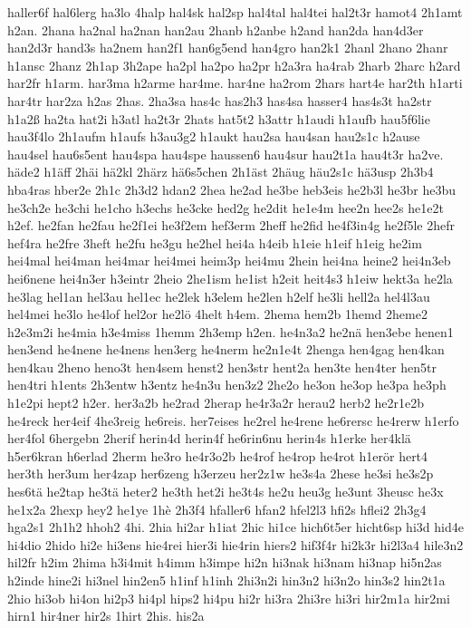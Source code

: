 {haller6f
hal6lerg
ha3lo
4halp
hal4sk
hal2sp
hal4tal
hal4tei
hal2t3r
hamot4
2h1amt
h2an.
2hana
ha2nal
ha2nan
han2au
2hanb
h2anbe
h2and
han2da
han4d3er
han2d3r
hand3s
ha2nem
han2f1
han6g5end
han4gro
han2k1
2hanl
2hano
2hanr
h1ansc
2hanz
2h1ap
3h2ape
ha2pl
ha2po
ha2pr
h2a3ra
ha4rab
2harb
2harc
h2ard
har2fr
h1arm.
har3ma
h2arme
har4me.
har4ne
ha2rom
2hars
hart4e
har2th
h1arti
har4tr
har2za
h2as
2has.
2ha3sa
has4c
has2h3
has4sa
hasser4
has4s3t
ha2str
h1a2ß
ha2ta
hat2i
h3atl
ha2t3r
2hats
hat5t2
h3attr
h1audi
h1aufb
hau5f6lie
hau3f4lo
2h1aufm
h1aufs
h3au3g2
h1aukt
hau2sa
hau4san
hau2s1c
h2ause
hau4sel
hau6s5ent
hau4spa
hau4spe
haussen6
hau4sur
hau2t1a
hau4t3r
ha2ve.
häde2
h1äff
2häi
hä2kl
2härz
hä6s5chen
2h1äst
2häug
häu2s1c
hä3usp
2h3b4
hba4ras
hber2e
2h1c
2h3d2
hdan2
2hea
he2ad
he3be
heb3eis
he2b3l
he3br
he3bu
he3ch2e
he3chi
he1cho
h3echs
he3cke
hed2g
he2dit
he1e4m
hee2n
hee2s
he1e2t
h2ef.
he2fan
he2fau
he2f1ei
he3f2em
hef3erm
2heff
he2fid
he4f3in4g
he2f5le
2hefr
hef4ra
he2fre
3heft
he2fu
he3gu
he2hel
hei4a
h4eib
h1eie
h1eif
h1eig
he2im
hei4mal
hei4man
hei4mar
hei4mei
heim3p
hei4mu
2hein
hei4na
heine2
hei4n3eb
hei6nene
hei4n3er
h3eintr
2heio
2he1ism
he1ist
h2eit
heit4s3
h1eiw
hekt3a
he2la
he3lag
hel1an
hel3au
hel1ec
he2lek
h3elem
he2len
h2elf
he3li
hell2a
hel4l3au
hel4mei
he3lo
he4lof
hel2or
he2lö
4helt
h4em.
2hema
hem2b
1hemd
2heme2
h2e3m2i
he4mia
h3e4miss
1hemm
2h3emp
h2en.
he4n3a2
he2nä
hen3ebe
henen1
hen3end
he4nene
he4nens
hen3erg
he4nerm
he2n1e4t
2henga
hen4gag
hen4kan
hen4kau
2heno
heno3t
hen4sem
henst2
hen3str
hent2a
hen3te
hen4ter
hen5tr
hen4tri
h1ents
2h3entw
h3entz
he4n3u
hen3z2
2he2o
he3on
he3op
he3pa
he3ph
h1e2pi
hept2
h2er.
her3a2b
he2rad
2herap
he4r3a2r
herau2
herb2
he2r1e2b
he4reck
her4eif
4he3reig
he6reis.
her7eises
he2rel
he4rene
he6rersc
he4rerw
h1erfo
her4fol
6hergebn
2herif
herin4d
herin4f
he6rin6nu
herin4s
h1erke
her4klä
h5er6kran
h6erlad
2herm
he3ro
he4r3o2b
he4rof
he4rop
he4rot
h1erör
hert4
her3th
her3um
her4zap
her6zeng
h3erzeu
her2z1w
he3s4a
2hese
he3si
he3s2p
hes6tä
he2tap
he3tä
heter2
he3th
het2i
he3t4s
he2u
heu3g
he3unt
3heusc
he3x
he1x2a
2hexp
hey2
he1ye
1hè
2h3f4
hfaller6
hfan2
hfel2l3
hfi2s
hflei2
2h3g4
hga2s1
2h1h2
hhoh2
4hi.
2hia
hi2ar
h1iat
2hic
hi1ce
hich6t5er
hicht6sp
hi3d
hid4e
hi4dio
2hido
hi2e
hi3ens
hie4rei
hier3i
hie4rin
hiers2
hif3f4r
hi2k3r
hi2l3a4
hile3n2
hil2fr
h2im
2hima
h3i4mit
h4imm
h3impe
hi2n
hi3nak
hi3nam
hi3nap
hi5n2as
h2inde
hine2i
hi3nel
hin2en5
h1inf
h1inh
2hi3n2i
hin3n2
hi3n2o
hin3s2
hin2t1a
2hio
hi3ob
hi4on
hi2p3
hi4pl
hips2
hi4pu
hi2r
hi3ra
2hi3re
hi3ri
hir2m1a
hir2mi
hirn1
hir4ner
hir2s
1hirt
2his.
his2a
}
